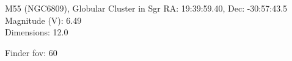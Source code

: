 \begin{block}{M55 (NGC6809), Globular Cluster in Sgr}
    RA: 19:39:59.40, Dec: -30:57:43.5 \\ 
    Magnitude (V): 6.49 \\ 
    Dimensions: 12.0 

    Finder fov: 60 
\end{block}